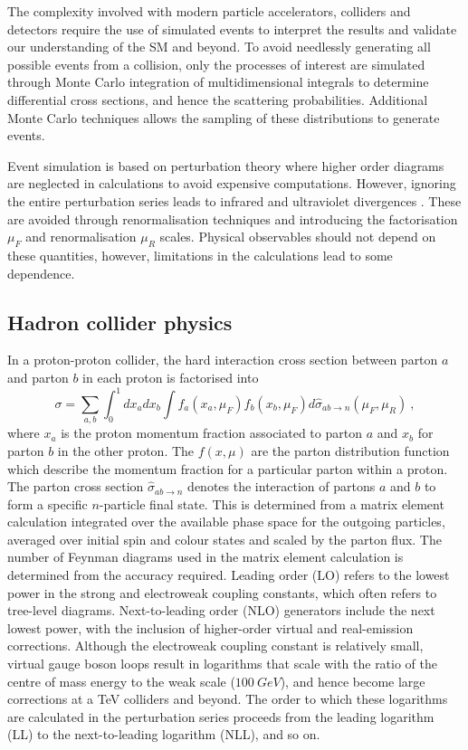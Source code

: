 The complexity involved with modern particle accelerators, colliders and detectors require the use of simulated events to interpret the results and validate our understanding of the SM and beyond. To avoid needlessly generating all possible events from a collision, only the processes of interest are simulated through Monte Carlo integration of multidimensional integrals to determine differential cross sections, and hence the scattering probabilities. Additional Monte Carlo techniques allows the sampling of these distributions to generate events.

Event simulation is based on perturbation theory where higher order diagrams are neglected in calculations to avoid expensive computations. However, ignoring the entire perturbation series leads to infrared and ultraviolet divergences \cite{Ellis:1991qj}. These are avoided through renormalisation techniques and introducing the factorisation $\mu_F$ and renormalisation $\mu_R$ scales. Physical observables should not depend on these quantities, however, limitations in the calculations lead to some dependence.


\subsection{Hadron collider physics}\label{sec:hadron-collider-physics}

In a proton-proton collider, the hard interaction cross section between parton $a$ and parton $b$ in each proton is factorised into \cite{Ellis:1991qj}
%
\begin{equation}
    \sigma = \sum_{a,b} \int_0^1 dx_a dx_b \int f_a(x_a,\mu_F)f_b(x_b,\mu_F) d\hat{\sigma}_{ab\rightarrow n}(\mu_F,\mu_R)\ ,
\end{equation}
%
where $x_a$ is the proton momentum fraction associated to parton $a$ and $x_b$ for parton $b$ in the other proton. The $f(x,\mu)$ are the parton distribution function which describe the momentum fraction for a particular parton within a proton. The parton cross section $\hat{\sigma}_{ab\rightarrow n}$ denotes the interaction of partons $a$ and $b$ to form a specific $n$-particle final state. This is determined from a matrix element calculation integrated over the available phase space for the outgoing particles, averaged over initial spin and colour states and scaled by the parton flux. The number of Feynman diagrams used in the matrix element calculation is determined from the accuracy required. Leading order (LO) refers to the lowest power in the strong and electroweak coupling constants, which often refers to tree-level diagrams. Next-to-leading order (NLO) generators include the next lowest power, with the inclusion of higher-order virtual and real-emission corrections. Although the electroweak coupling constant is relatively small, virtual gauge boson loops result in logarithms \cite{Sudakov:1954sw} that scale with the ratio of the centre of mass energy to the weak scale ($\SI{100}{GeV}$), and hence become large corrections at a TeV colliders and beyond. The order to which these logarithms are calculated in the perturbation series proceeds from the leading logarithm (LL) to the next-to-leading logarithm (NLL), and so on.

